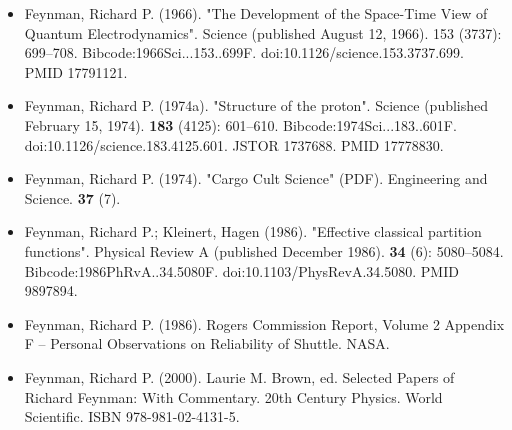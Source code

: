 \begin{itemize}
\item Feynman, Richard P. (1966). "The Development of the Space-Time View of Quantum Electrodynamics". Science (published August 12, 1966). 153 (3737): 699–708. Bibcode:1966Sci...153..699F. doi:10.1126/science.153.3737.699. PMID 17791121.
\item Feynman, Richard P. (1974a). "Structure of the proton". Science (published February 15, 1974). \textbf{183} (4125): 601–610. Bibcode:1974Sci...183..601F. doi:10.1126/science.183.4125.601. JSTOR 1737688. PMID 17778830.
\item Feynman, Richard P. (1974). "Cargo Cult Science" (PDF). Engineering and Science. \textbf{37} (7).
\item Feynman, Richard P.; Kleinert, Hagen (1986). "Effective classical partition functions". Physical Review A (published December 1986). \textbf{34} (6): 5080–5084. Bibcode:1986PhRvA..34.5080F. doi:10.1103/PhysRevA.34.5080. PMID 9897894.
\item Feynman, Richard P. (1986). Rogers Commission Report, Volume 2 Appendix F – Personal Observations on Reliability of Shuttle. NASA.
\item Feynman, Richard P. (2000). Laurie M. Brown, ed. Selected Papers of Richard Feynman: With Commentary. 20th Century Physics. World Scientific. ISBN 978-981-02-4131-5.
\end{itemize}
